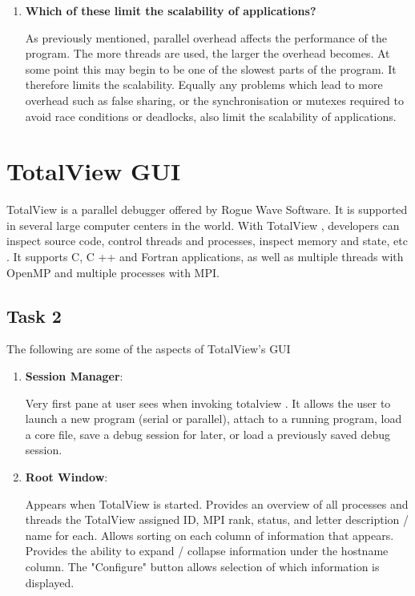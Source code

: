 \documentclass[10pt, letterpaper, twoside]{article}
\begin{document}
\begin{titlepage}
\begin{enumerate}
\item\textbf{Which of these limit the scalability of applications?} 
 
As previously mentioned, parallel overhead affects the performance of the program. The more threads are used, the larger the overhead becomes. At some point this may begin to be one of the slowest parts of the program. It therefore limits the scalability. Equally
any problems which lead to more overhead such as false sharing, or the synchronisation or mutexes required to avoid race conditions or deadlocks, also limit the scalability of applications. \\

\end{enumerate}

\setcounter{section}{4}
\section { TotalView GUI}

TotalView is a parallel debugger offered by Rogue Wave Software. It is supported in several large computer centers in the world. With TotalView , developers can inspect source code, control threads and processes, inspect memory and state, etc . It supports C, C ++ and Fortran applications, as well as multiple threads with OpenMP and multiple processes with MPI. \\

\subsection {Task 2}

The following are some of the aspects of TotalView's GUI

\begin{enumerate}
\item \textbf{Session Manager}:

Very first pane at user sees when invoking totalview . It allows the user to launch a new program (serial or parallel), attach to a running program, load a core file, save a debug session for later, or
load a previously saved debug session. \\

\item \textbf{Root Window}:

Appears when TotalView is started. Provides an overview of all processes and threads the TotalView assigned ID, MPI rank, status, and letter description / name for each. Allows sorting on each
column of information that appears. Provides the ability to expand / collapse information under the hostname column. The "Configure" button allows selection of which information is displayed. \\



\end{enumerate}
\end{titlepage}
\end{document}
